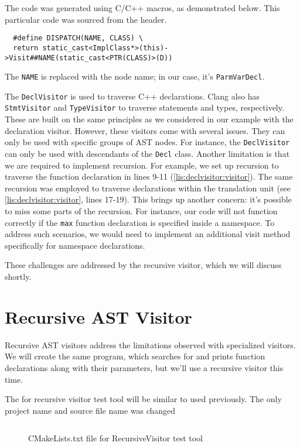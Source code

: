 The code was generated using C/C++ macros, as demonstrated below. This
particular code was sourced from the  header.
\begin{verbatim}
  #define DISPATCH(NAME, CLASS) \
  return static_cast<ImplClass*>(this)->Visit##NAME(static_cast<PTR(CLASS)>(D))
\end{verbatim}
The \texttt{NAME} is replaced with the node name; in our case, it's
\texttt{ParmVarDecl}. 

The \texttt{DeclVisitor} is used to traverse C++ declarations. Clang
also has \texttt{StmtVisitor} and \texttt{TypeVisitor} to
traverse statements and types, respectively. These are built on the same
principles as we  considered in our example with the declaration
visitor. However, these visitors come with several 
issues. They can only be used with specific groups of AST nodes. For instance,
the \texttt{DeclVisitor} can only be used with descendants of the
\texttt{Decl} class. 
Another limitation is that we are required to implement recursion. For example,
we set up recursion to traverse the function declaration in lines 
9-11 (\cref{lis:declvisitor:visitor}). The same recursion was employed to
traverse declarations within the translation unit (see
\cref{lis:declvisitor:visitor}, lines 17-19). This brings up another concern:
it's possible to miss some parts of the recursion. For instance, our code will
not function correctly if the \texttt{max} function declaration is
specified inside a namespace. 
To address such scenarios, we would need to implement an additional visit method
specifically for namespace declarations.

These challenges are addressed by the recursive visitor, which we will discuss
shortly. 

\section{Recursive AST Visitor}
\label{sec:ch3:recursive_ast_visitor}
Recursive AST visitors address the limitations observed with specialized
visitors. We will create the same program, which searches for and prints
function declarations along with their parameters, but we'll use a recursive
visitor this time. 

The  for recursive visitor test tool will be similar to
used previously. The only project name and source file name was changed
\begin{figure}[H]
\inputminted[highlightlines={2,14-17}]{cmake}{src/part1/ch3_ast/recursivevisitor/CMakeLists.txt}
\caption{CMakeLists.txt file for RecursiveVisitor test tool}
\label{lis:cmake:recursivevisitor}
\end{figure}

